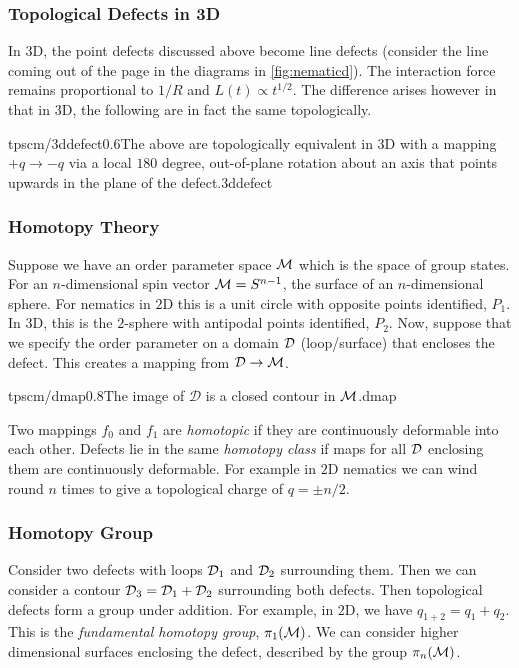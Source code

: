 \subsubsection{Topological Defects in 3D}
In $3$D, the point defects discussed above become line defects (consider the line coming out of the page in the diagrams in \autoref{fig:nematicd}). The interaction force remains proportional to $1/R$ and $L(t) \propto t^{1/2}$. The difference arises however in that in $3$D, the following are in fact the same topologically.
\begin{mygraphic}{tpscm/3ddefect}{0.6}{The above are topologically equivalent in $3$D with a mapping $+q \rightarrow -q$ via a local $180$ degree, out-of-plane rotation about an axis that points upwards in the plane of the defect.}{3ddefect}\end{mygraphic}
\subsubsection{Homotopy Theory}
Suppose we have an order parameter space $\mathcal{M}$ which is the space of group states. For an $n$-dimensional spin vector $\mathcal{M} = S^{n - 1}$, the surface of an $n$-dimensional sphere. For nematics in $2$D this is a unit circle with opposite points identified, $P_1$. In $3$D, this is the $2$-sphere with antipodal points identified, $P_2$. Now, suppose that we specify the order parameter on a domain $\mathcal{D}$ (loop/surface) that encloses the defect. This creates a mapping from $\mathcal{D} \rightarrow \mathcal{M}$.
\begin{mygraphic}{tpscm/dmap}{0.8}{The image of $\mathcal{D}$ is a closed contour in $\mathcal{M}$.}{dmap}\end{mygraphic}
Two mappings $f_0$ and $f_1$ are \emph{homotopic} if they are continuously deformable into each other. Defects lie in the same \emph{homotopy class} if maps for all $\mathcal{D}$ enclosing them are continuously deformable. For example in $2$D nematics we can wind round $n$ times to give a topological charge of $q = \pm n/2$.
\subsubsection*{Homotopy Group}
Consider two defects with loops $\mathcal{D}_1$ and $\mathcal{D}_2$ surrounding them. Then we can consider a contour $\mathcal{D}_3 = \mathcal{D}_1 + \mathcal{D}_2$ surrounding both defects. Then topological defects form a group under addition. For example, in $2$D, we have $q_{1 + 2} = q_1 + q_2$. This is the \emph{fundamental homotopy group}, $\pi_1(\mathcal{M})$. We can consider higher dimensional surfaces enclosing the defect, described by the group $\pi_n(\mathcal{M})$. 

